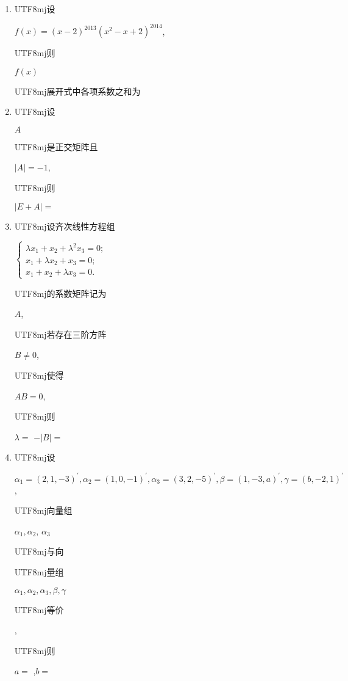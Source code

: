 \documentclass[10pt]{article}
\begin{document}
\begin{enumerate}
  \item \begin{CJK}{UTF8}{mj}设\end{CJK} $f(x)=(x-2)^{2013}\left(x^{2}-x+2\right)^{2014}$, \begin{CJK}{UTF8}{mj}则\end{CJK} $f(x)$ \begin{CJK}{UTF8}{mj}展开式中各项系数之和为\end{CJK}

  \item \begin{CJK}{UTF8}{mj}设\end{CJK} $A$ \begin{CJK}{UTF8}{mj}是正交矩阵且\end{CJK} $|A|=-1$, \begin{CJK}{UTF8}{mj}则\end{CJK} $|E+A|=$

  \item \begin{CJK}{UTF8}{mj}设齐次线性方程组\end{CJK} $\left\{\begin{array}{l}\lambda x_{1}+x_{2}+\lambda^{2} x_{3}=0 ; \\ x_{1}+\lambda x_{2}+x_{3}=0 ; \\ x_{1}+x_{2}+\lambda x_{3}=0 .\end{array}\right.$ \begin{CJK}{UTF8}{mj}的系数矩阵记为\end{CJK} $A$, \begin{CJK}{UTF8}{mj}若存在三阶方阵\end{CJK} $B \neq 0$, \begin{CJK}{UTF8}{mj}使得\end{CJK} $A B=0$, \begin{CJK}{UTF8}{mj}则\end{CJK} $\lambda=$ $-|B|=$

  \item \begin{CJK}{UTF8}{mj}设\end{CJK} $\alpha_{1}=(2,1,-3)^{\prime}, \alpha_{2}=(1,0,-1)^{\prime}, \alpha_{3}=(3,2,-5)^{\prime}, \beta=(1,-3, a)^{\prime}, \gamma=(b,-2,1)^{\prime}$, \begin{CJK}{UTF8}{mj}向量组\end{CJK} $\alpha_{1}, \alpha_{2}$, $\alpha_{3}$ \begin{CJK}{UTF8}{mj}与向\end{CJK} \begin{CJK}{UTF8}{mj}量组\end{CJK} $\alpha_{1}, \alpha_{2}, \alpha_{3}, \beta, \gamma$ \begin{CJK}{UTF8}{mj}等价\end{CJK}, \begin{CJK}{UTF8}{mj}则\end{CJK} $a=$ ,$b=$


\end{enumerate}
\end{document}
